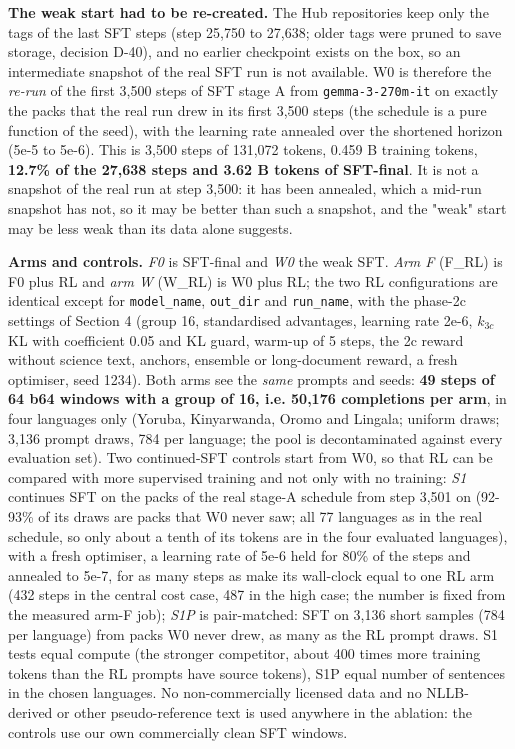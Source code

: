 \textbf{The weak start had to be re-created.} The Hub repositories keep only the tags of the last SFT steps (step 25,750 to 27,638; older tags were pruned to save storage, decision D-40), and no earlier checkpoint exists on the box, so an intermediate snapshot of the real SFT run is not available. W0 is therefore the \emph{re-run} of the first 3,500 steps of SFT stage A from \texttt{gemma-3-270m-it} on exactly the packs that the real run drew in its first 3,500 steps (the schedule is a pure function of the seed), with the learning rate annealed over the shortened horizon (5e-5 to 5e-6). This is 3,500 steps of 131,072 tokens, 0.459 B training tokens, \textbf{12.7\% of the 27,638 steps and 3.62 B tokens of SFT-final}. It is not a snapshot of the real run at step 3,500: it has been annealed, which a mid-run snapshot has not, so it may be better than such a snapshot, and the "weak" start may be less weak than its data alone suggests.

\textbf{Arms and controls.} \emph{F0} is SFT-final and \emph{W0} the weak SFT. \emph{Arm F} (F\_RL) is F0 plus RL and \emph{arm W} (W\_RL) is W0 plus RL; the two RL configurations are identical except for \texttt{model\_name}, \texttt{out\_dir} and \texttt{run\_name}, with the phase-2c settings of Section 4 (group 16, standardised advantages, learning rate 2e-6, \(k_{3c}\) KL with coefficient 0.05 and KL guard, warm-up of 5 steps, the 2c reward without science text, anchors, ensemble or long-document reward, a fresh optimiser, seed 1234). Both arms see the \emph{same} prompts and seeds: \textbf{49 steps of 64 b64 windows with a group of 16, i.e. 50,176 completions per arm}, in four languages only (Yoruba, Kinyarwanda, Oromo and Lingala; uniform draws; 3,136 prompt draws, 784 per language; the pool is decontaminated against every evaluation set). Two continued-SFT controls start from W0, so that RL can be compared with more supervised training and not only with no training: \emph{S1} continues SFT on the packs of the real stage-A schedule from step 3,501 on (92-93\% of its draws are packs that W0 never saw; all 77 languages as in the real schedule, so only about a tenth of its tokens are in the four evaluated languages), with a fresh optimiser, a learning rate of 5e-6 held for 80\% of the steps and annealed to 5e-7, for as many steps as make its wall-clock equal to one RL arm (432 steps in the central cost case, 487 in the high case; the number is fixed from the measured arm-F job); \emph{S1P} is pair-matched: SFT on 3,136 short samples (784 per language) from packs W0 never drew, as many as the RL prompt draws. S1 tests equal compute (the stronger competitor, about 400 times more training tokens than the RL prompts have source tokens), S1P equal number of sentences in the chosen languages. No non-commercially licensed data and no NLLB-derived or other pseudo-reference text is used anywhere in the ablation: the controls use our own commercially clean SFT windows.

